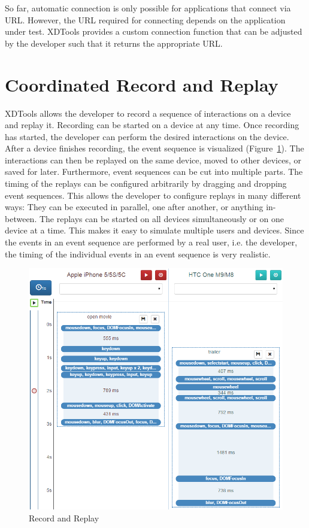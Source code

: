 So far, automatic connection is only possible for applications that connect via URL. However, the URL required for connecting depends on the application under test. XDTools provides a custom connection function that can be adjusted by the developer such that it returns the appropriate URL.

\section{Coordinated Record and Replay}

XDTools allows the developer to record a sequence of interactions on a device and replay it. Recording can be started on a device at any time. Once recording has started, the developer can perform the desired interactions on the device. After a device finishes recording, the event sequence is visualized (Figure~\ref{fig:record_replay}). The interactions can then be replayed on the same device, moved to other devices, or saved for later.  Furthermore, event sequences can be cut into multiple parts. The timing of the replays can be configured arbitrarily by dragging and dropping event sequences. This allows the developer to configure replays in many different ways: They can be executed in parallel, one after another, or anything in-between. The replays can be started on all devices simultaneously or on one device at a time. This makes it easy to simulate multiple users and devices. Since the events in an event sequence are performed by a real user, i.e. the developer, the timing of the individual events in an event sequence is very realistic.

\begin{figure}[H]
  \centering
    \includegraphics[width=1.0\textwidth]{images/screenshots/record_replay_2.png}
	\caption[Screenshot: Record and replay]{Record and Replay}
	\label{fig:record_replay}
\end{figure}

